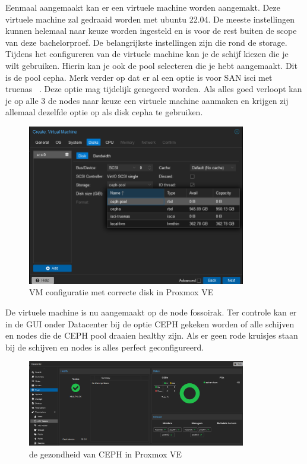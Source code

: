 Eenmaal aangemaakt kan er een virtuele machine worden aangemakt. Deze virtuele machine zal gedraaid worden met ubuntu 22.04.
De meeste instellingen kunnen helemaal naar keuze worden ingesteld en is voor de rest buiten de scope van deze bachelorproef. De belangrijkste instellingen zijn die rond de storage.
Tijdens het configureren van de virtuele machine kan je de schijf kiezen die je wilt gebruiken. Hierin kan je ook de pool selecteren die je hebt aangemaakt. Dit is de pool cepha.
Merk verder op dat er al een optie is voor SAN isci met truenas~\autocite{truenas} . Deze optie mag tijdelijk genegeerd worden.
Als alles goed verloopt kan je op alle 3 de nodes naar keuze een virtuele machine aanmaken en krijgen zij allemaal dezelfde optie op als disk cepha te gebruiken.
\begin{figure}[H]
  \centering
  \includegraphics[width=0.85\textwidth]{../poc/vm-storage-prox.png}
  \caption{VM configuratie met correcte disk in Proxmox VE}
  \label{fig:vm-storage-proxmox}
\end{figure}

De virtuele machine is nu aangemaakt op de node fossoirak.
Ter controle kan er in de GUI onder Datacenter bij de optie CEPH gekeken worden of alle schijven en nodes die de CEPH pool draaien healthy zijn.
Als er geen rode kruisjes staan bij de schijven en nodes is alles perfect geconfigureerd.
\begin{figure}[H]
  \centering
  \includegraphics[width=0.85\textwidth]{../poc/ceph-healthy-prox.png}
  \caption{de gezondheid van CEPH  in Proxmox VE}
  \label{fig:ceph-healthy-prox}
\end{figure}


